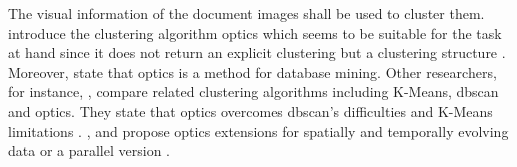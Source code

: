 The visual information of the document images shall be used to cluster them.
\citeauthor{OPTICS1999} introduce the clustering algorithm \acs*{optics} which seems to be suitable for the task at hand 
since it does not return an explicit clustering but a clustering structure \cite{OPTICS1999}.
Moreover, \citeauthor{OPTICS1999} state that \acs*{optics} is a method for database mining.
Other researchers, for instance, \citeauthor{OPTICS_kMeans_2016}, compare related clustering algorithms including K-Means, \acs*{dbscan} and \acs*{optics}.
They state that \acs*{optics} overcomes \acs*{dbscan}'s difficulties and K-Means limitations \cite{OPTICS_kMeans_2016}.
\citeauthor{OPTICS2013}, \citeauthor{OPTICS2014} and \citeauthor{OPTICS2016} propose \acs*{optics} extensions 
for spatially and temporally evolving data or a parallel version \cite{OPTICS2013, OPTICS2014, OPTICS2016}.